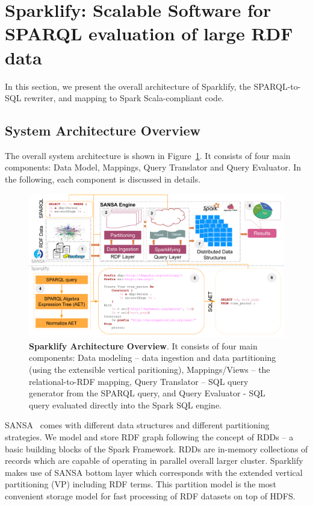 \section{Sparklify: Scalable Software for SPARQL evaluation of large RDF data}
\label{sec:sparklify-approach}
In this section, we present the overall architecture of Sparklify, the SPARQL-to-SQL rewriter, and mapping to Spark Scala-compliant code.

\subsection{System Architecture Overview}
\label{sec:sparklify-architecture}

The overall system architecture is shown in Figure~\ref{fig:sparklify-architecture}.
It consists of four main components: Data Model, Mappings, Query Translator and Query Evaluator.
In the following, each component is discussed in details.

\begin{figure}
\centering
\includegraphics[width=1.0\textwidth]{images/6_scalable_rdf_querying/sparklify-architecture.pdf}
\caption{\textbf{Sparklify Architecture Overview}.
It consists of four main components: Data modeling -- data ingestion and data partitioning (using the extensible vertical paritioning), Mappings/Views -- the relational-to-RDF mapping, Query Translator -- SQL query generator from the SPARQL query, and Query Evaluator - SQL query evaluated directly into the Spark SQL engine.
}
\label{fig:sparklify-architecture}
\end{figure}


SANSA~\cite{lehmann-2017-sansa-iswc} comes with different data structures and different partitioning strategies.
We model and store \gls{RDF} graph following the concept of \gls{RDD}s -- a basic building blocks of the Spark Framework.
\gls{RDD}s are in-memory collections of records which are capable of operating in parallel overall larger cluster.
Sparklify makes use of SANSA bottom layer which corresponds with the extended vertical partitioning (VP) including \gls{RDF} terms.
This partition model is the most convenient storage model for fast processing of \gls{RDF} datasets on top of \gls{HDFS}.
